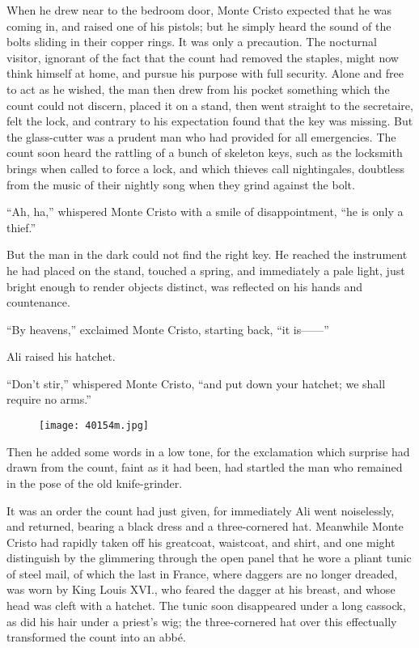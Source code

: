 When he drew near to the bedroom door, Monte Cristo expected that he
was coming in, and raised one of his pistols; but he simply heard the
sound of the bolts sliding in their copper rings. It was only a
precaution. The nocturnal visitor, ignorant of the fact that the count
had removed the staples, might now think himself at home, and pursue
his purpose with full security. Alone and free to act as he wished, the
man then drew from his pocket something which the count could not
discern, placed it on a stand, then went straight to the secretaire,
felt the lock, and contrary to his expectation found that the key was
missing. But the glass-cutter was a prudent man who had provided for
all emergencies. The count soon heard the rattling of a bunch of
skeleton keys, such as the locksmith brings when called to force a
lock, and which thieves call nightingales, doubtless from the music of
their nightly song when they grind against the bolt.

“Ah, ha,” whispered Monte Cristo with a smile of disappointment, “he is
only a thief.”

But the man in the dark could not find the right key. He reached the
instrument he had placed on the stand, touched a spring, and
immediately a pale light, just bright enough to render objects
distinct, was reflected on his hands and countenance.

“By heavens,” exclaimed Monte Cristo, starting back, “it is——”

Ali raised his hatchet.

“Don’t stir,” whispered Monte Cristo, “and put down your hatchet; we
shall require no arms.”

\begin{figure}[ht]
\texttt{[image: 40154m.jpg]}
\end{figure}

Then he added some words in a low tone, for the exclamation which
surprise had drawn from the count, faint as it had been, had startled
the man who remained in the pose of the old knife-grinder.

It was an order the count had just given, for immediately Ali went
noiselessly, and returned, bearing a black dress and a three-cornered
hat. Meanwhile Monte Cristo had rapidly taken off his greatcoat,
waistcoat, and shirt, and one might distinguish by the glimmering
through the open panel that he wore a pliant tunic of steel mail, of
which the last in France, where daggers are no longer dreaded, was worn
by King Louis XVI., who feared the dagger at his breast, and whose head
was cleft with a hatchet. The tunic soon disappeared under a long
cassock, as did his hair under a priest’s wig; the three-cornered hat
over this effectually transformed the count into an abbé.


